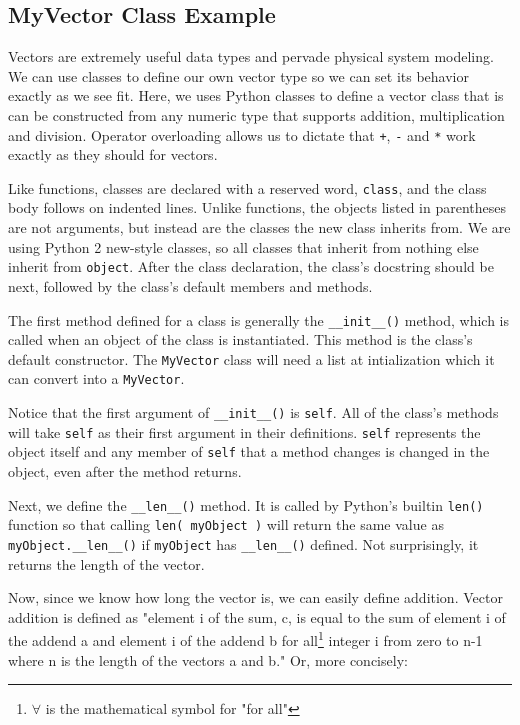 \subsection{MyVector Class Example}



Vectors are extremely useful data types and pervade physical system modeling. We can use classes to define our own vector type so we can set its behavior exactly as we see fit. Here, we uses Python classes to define a vector class that is can be constructed from any numeric type that supports addition, multiplication and division. Operator overloading allows us to dictate that \verb|+|, \verb|-| and \verb|*| work exactly as they should for vectors.

Like functions, classes are declared with a reserved word, \verb|class|, and the class body follows on indented lines. Unlike functions, the objects listed in parentheses are not arguments, but instead are the classes the new class inherits from. We are using Python 2 new-style classes, so all classes that inherit from nothing else inherit from \verb|object|. After the class declaration, the class's docstring should be next, followed by the class's default members and methods.

The first method defined for a class is generally the \verb|__init__()| method, which is called when an object of the class is instantiated. This method is the class's default constructor. The \verb|MyVector| class will need a list at intialization which it can convert into a \verb|MyVector|.

Notice that the first argument of \verb|__init__()| is \verb|self|. All of the class's methods will take \verb|self| as their first argument in their definitions. \verb|self| represents the object itself and any member of \verb|self| that a method changes is changed in the object, even after the method returns.

Next, we define the \verb|__len__()| method. It is called by Python's builtin \verb|len()| function so that calling \verb|len( myObject )| will return the same value as \verb|myObject.__len__()| if \verb|myObject| has \verb|__len__()| defined. Not surprisingly, it returns the length of the vector.

Now, since we know how long the vector is, we can easily define addition. Vector addition is defined as "element i of the sum, c, is equal to the sum of element i of the addend a and element i of the addend b for all\footnote{\begin{math}\forall\end{math} is the mathematical symbol for "for all"} integer i from zero to n-1 where n is the length of the vectors a and b." Or, more concisely:

